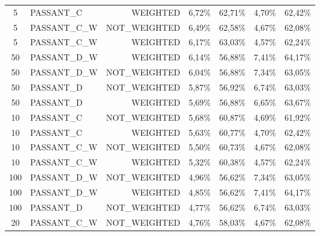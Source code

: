 \begin{table}[H]
{\begin{tabular}{ c l r c c c c }
			5 &  PASSANT\_C &   WEIGHTED &     6,72\% &    62,71\% &     4,70\% &    62,42\% \\
			
			5 & PASSANT\_C\_W & NOT\_WEIGHTED &     6,49\% &    62,58\% &     4,67\% &    62,08\% \\
			
			5 & PASSANT\_C\_W &   WEIGHTED &     6,17\% &    63,03\% &     4,57\% &    62,24\% \\
			
			50 & PASSANT\_D\_W &   WEIGHTED &     6,14\% &    56,88\% &     7,41\% &    64,17\% \\
			
			50 & PASSANT\_D\_W & NOT\_WEIGHTED &     6,04\% &    56,88\% &     7,34\% &    63,05\% \\
			
			50 &  PASSANT\_D & NOT\_WEIGHTED &     5,87\% &    56,92\% &     6,74\% &    63,03\% \\
			
			50 &  PASSANT\_D &   WEIGHTED &     5,69\% &    56,88\% &     6,65\% &    63,67\% \\
			
			10 &  PASSANT\_C & NOT\_WEIGHTED &     5,68\% &    60,87\% &     4,69\% &    61,92\% \\
			
			10 &  PASSANT\_C &   WEIGHTED &     5,63\% &    60,77\% &     4,70\% &    62,42\% \\
			
			10 & PASSANT\_C\_W & NOT\_WEIGHTED &     5,50\% &    60,73\% &     4,67\% &    62,08\% \\
			
			10 & PASSANT\_C\_W &   WEIGHTED &     5,32\% &    60,38\% &     4,57\% &    62,24\% \\
			
			100 & PASSANT\_D\_W & NOT\_WEIGHTED &     4,96\% &    56,62\% &     7,34\% &    63,05\% \\
			
			100 & PASSANT\_D\_W &   WEIGHTED &     4,85\% &    56,62\% &     7,41\% &    64,17\% \\
			
			100 &  PASSANT\_D & NOT\_WEIGHTED &     4,77\% &    56,62\% &     6,74\% &    63,03\% \\
			
			20 & PASSANT\_C\_W & NOT\_WEIGHTED &     4,76\% &    58,03\% &     4,67\% &    62,08\% \\
			

\end{tabular}}
\end{table}

